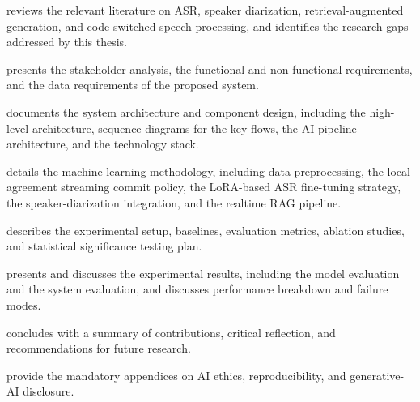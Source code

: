 \begin{description}[itemsep=0.3em,leftmargin=4cm,style=nextline]
  \item[\Cref{ch:background}] reviews the relevant literature on ASR,
  speaker diarization, retrieval-augmented generation, and code-switched
  speech processing, and identifies the research gaps addressed by this
  thesis.
  \item[\Cref{ch:requirements}] presents the stakeholder analysis, the
  functional and non-functional requirements, and the data requirements
  of the proposed system.
  \item[\Cref{ch:architecture}] documents the system architecture and
  component design, including the high-level architecture, sequence
  diagrams for the key flows, the AI pipeline architecture, and the
  technology stack.
  \item[\Cref{ch:ml-methodology}] details the machine-learning
  methodology, including data preprocessing, the local-agreement
  streaming commit policy, the LoRA-based ASR fine-tuning strategy, the
  speaker-diarization integration, and the realtime RAG pipeline.
  \item[\Cref{ch:experiments}] describes the experimental setup,
  baselines, evaluation metrics, ablation studies, and statistical
  significance testing plan.
  \item[\Cref{ch:results}] presents and discusses the experimental
  results, including the model evaluation and the system evaluation, and
  discusses performance breakdown and failure modes.
  \item[\Cref{ch:conclusion}] concludes with a summary of contributions,
  critical reflection, and recommendations for future research.
  \item[\Cref{app:ethics,app:repro,app:genai}] provide the mandatory
  appendices on AI ethics, reproducibility, and generative-AI
  disclosure.
\end{description}
